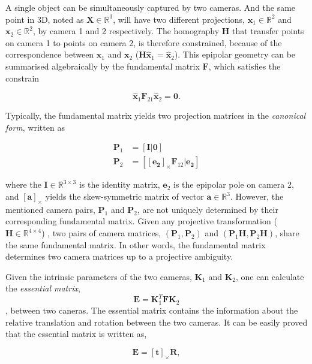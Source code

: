 \documentclass[11pt,twoside]{report}
\begin{document}
A single object can be simultaneously captured by two cameras. And the same point in 3D, noted as $\mathbf{X} \in \mathbb{R}^3$, will have two different projections, $\mathbf{x}_1 \in \mathbb{R}^2$ and $\mathbf{x}_2 \in \mathbb{R}^2$, by camera 1 and 2 respectively. The homography $\mathbf{H}$ that transfer points on camera 1 to points on camera 2, is therefore constrained, because of the correspondence between $\mathbf{x}_1$ and $\mathbf{x}_2$ ($\mathbf{H}\hat{\mathbf{x}}_1 = \hat{\mathbf{x}}_2$). This epipolar geometry can be summarised algebraically by the fundamental matrix $\mathbf{F}$, which satisfies the constrain

$$
\hat{\mathbf{x}}_1  \mathbf{F}_{21}  \hat{\mathbf{x}}_2
= \mathbf{0}.
$$

Typically, the fundamental matrix yields two projection matrices in the \emph{canonical form}, written as

$$
\begin{aligned}
	\mathbf{P}_1 &= \left[\mathbf{I} | \mathbf{0}\right] \\
	\mathbf{P}_2 &= \left[ [\mathbf{e_2}]_\times \mathbf{F}_{12} | \mathbf{e_2} \right]
\end{aligned}
$$

\noindent where the $\mathbf{I} \in \mathbb{R}^{3\times3}$ is the identity matrix, $\mathbf{e}_2$ is the epipolar pole on camera 2, and $[\mathbf{a}]_\times$ yields the skew-symmetric matrix of vector $\mathbf{a} \in \mathbb{R}^3$. However, the mentioned camera pairs, $\mathbf{P}_1$ and $\mathbf{P}_2$, are not uniquely determined by their corresponding fundamental matrix. Given any projective transformation ($\mathbf{H} \in \mathbb{R}^{4 \times 4}$) , two pairs of camera matrices, $(\mathbf{P}_1, \mathbf{P}_2)$ and $(\mathbf{P}_1 \mathbf{H}, \mathbf{P}_2 \mathbf{H})$, share the same fundamental matrix. In other words, the fundamental matrix determines two camera matrices up to a projective ambiguity.

Given the intrinsic parameters of the two cameras, $\mathbf{K}_1$ and $\mathbf{K}_2$, one can calculate the \emph{essential matrix}, $$\mathbf{E} = \mathbf{K}_1^T \mathbf{F} \mathbf{K}_2$$, between two caneras. The essential matrix contains the information about the relative translation and rotation between the two cameras. It can be easily proved that the essential matrix is written as,

$$
\mathbf{E} = [\mathbf{t}]_\times \mathbf{R},
$$
\end{document}
